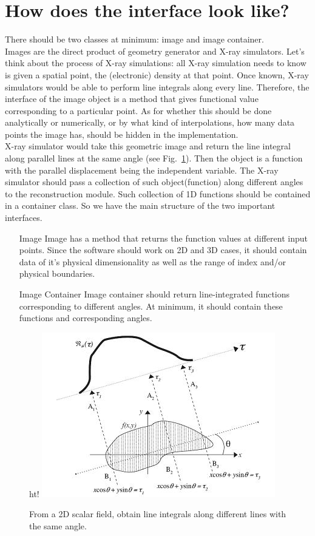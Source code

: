 \documentclass[11]{article}
\begin{document}
\section{How does the interface look like?}
	There should be two classes at minimum: image and image container.\\ Images are the direct product of geometry generator and X-ray simulators. Let's think about the process of X-ray simulations: all X-ray simulation needs to know is given a spatial point, the (electronic) density at that point. Once known, X-ray simulators would be able to perform line integrals along every line. Therefore, the interface of the image object is a method that gives functional value corresponding to a particular point. As for whether this should be done analytically or numerically, or by what kind of interpolations, how many data points the image has, should be hidden in the implementation. \\
	X-ray simulator would take this geometric image and return the line integral along parallel lines at the same angle (see Fig.~\ref{line_integral}). Then the object is a function with the parallel displacement being the independent variable. The X-ray simulator should pass a collection of such object(function) along different angles to the reconstruction module. Such collection of 1D functions should be contained in a container class. So we have the main structure of the two important interfaces.
	\begin{itemize}
		\item[Image]
			Image has a method that returns the function values at different input points. Since the software should work on 2D and 3D cases, it should contain data of it's physical dimensionality as well as the range of index and/or physical boundaries.
		\item[Image Container]
			Image container should return line-integrated functions corresponding to different angles. At minimum, it should contain these functions and corresponding angles.
	\end{itemize}

	\begin{figure}{ht!}
	\includegraphics[scale=0.8]{line_integral}
	\centering
	\caption{From a 2D scalar field, obtain line integrals along different lines with the same angle\cite{line_integral}.}\label{line_integral}
	\end{figure}
\end{document}
